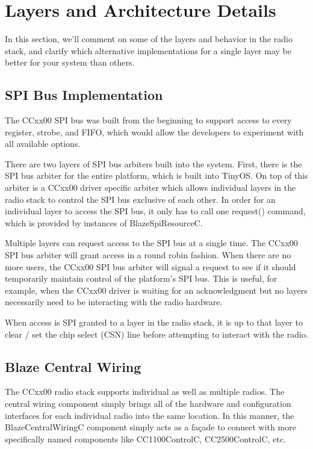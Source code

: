 \documentclass{article}
\begin{document}
\section{Layers and Architecture Details}
\label{sec:layersandarchitecturedetails}
In this section, we'll comment on some of the layers and behavior in the radio stack,
and clarify which alternative implementations for a single layer may be better for your
system than others.

\subsection{SPI Bus Implementation}
\label{sec:spibus}
The CCxx00 SPI bus was built from the beginning to support access to every register,
strobe, and FIFO, which would allow the developers to experiment with all available 
options.

There are two layers of SPI bus arbiters built into the system. First, there is
the SPI bus arbiter for the entire platform, which is built into TinyOS. On top of 
this arbiter is a CCxx00 driver specific arbiter which allows individual layers 
in the radio stack to control the SPI bus exclusive of each other.
In order for an individual layer to access the SPI bus, it only has to call one 
request() command, which is provided by instances of BlazeSpiResourceC. 

Multiple layers can request access to the SPI bus at a single time. The CCxx00
SPI bus arbiter will grant access in a round robin fashion.  When there are no
more users, the CCxx00 SPI bus arbiter will signal a request to see if it
should temporarily maintain control of the platform's SPI bus. This is useful,
for example, when the CCxx00 driver is waiting for an acknowledgment but no layers
necessarily need to be interacting with the radio hardware.

When access is SPI granted to a layer in the radio stack, it is up to that layer
to clear / set the chip select (CSN) line before attempting to interact with the
radio.

\subsection{Blaze Central Wiring}
\label{sec:centralwiring}
The CCxx00 radio stack supports individual as well as multiple radios.  The 
central wiring component simply brings all of the hardware and configuration
interfaces for each individual radio into the same location.  In this manner,
the BlazeCentralWiringC component simply acts as a fa\c{c}ade to connect with
more specifically named components like CC1100ControlC, CC2500ControlC, etc.
\end{document}
